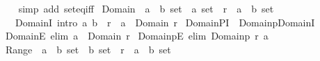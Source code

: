 \begin{isabellebody}
%
\isadelimproof
\ \ %
\endisadelimproof
%
\isatagproof
{}\isamarkupfalse%
\ {\isacharparenleft}{\kern0pt}simp\ add{\isacharcolon}{\kern0pt}\ set{\isacharunderscore}{\kern0pt}eq{\isacharunderscore}{\kern0pt}iff{\isacharparenright}{\kern0pt}%
\endisatagproof
{\isafoldproof}%
%
\isadelimproof
%
\endisadelimproof
%
\isadelimdocument
%
\endisadelimdocument
%
\isatagdocument
%
\isamarkuptrue%
%
\endisatagdocument
{\isafolddocument}%
%
\isadelimdocument
%
\endisadelimdocument
{}\isamarkupfalse%
\ Domain\ {\isacharcolon}{\kern0pt}{\isacharcolon}{\kern0pt}\ {\isachardoublequoteopen}{\isacharparenleft}{\kern0pt}{\isacharprime}{\kern0pt}a\ {\isasymtimes}\ {\isacharprime}{\kern0pt}b{\isacharparenright}{\kern0pt}\ set\ {\isasymRightarrow}\ {\isacharprime}{\kern0pt}a\ set{\isachardoublequoteclose}\ \ r\ {\isacharcolon}{\kern0pt}{\isacharcolon}{\kern0pt}\ {\isachardoublequoteopen}{\isacharparenleft}{\kern0pt}{\isacharprime}{\kern0pt}a\ {\isasymtimes}\ {\isacharprime}{\kern0pt}b{\isacharparenright}{\kern0pt}\ set{\isachardoublequoteclose}\isanewline
\ \ \ DomainI\ {\isacharbrackleft}{\kern0pt}intro{\isacharbrackright}{\kern0pt}{\isacharcolon}{\kern0pt}\ {\isachardoublequoteopen}{\isacharparenleft}{\kern0pt}a{\isacharcomma}{\kern0pt}\ b{\isacharparenright}{\kern0pt}\ {\isasymin}\ r\ {\isasymLongrightarrow}\ a\ {\isasymin}\ Domain\ r{\isachardoublequoteclose}\isanewline
\isanewline
{}\isamarkupfalse%
\ DomainPI\ {\isacharequal}{\kern0pt}\ Domainp{\isachardot}{\kern0pt}DomainI\isanewline
\isanewline
{}\isamarkupfalse%
\ DomainE\ {\isacharbrackleft}{\kern0pt}elim{\isacharbang}{\kern0pt}{\isacharbrackright}{\kern0pt}{\isacharcolon}{\kern0pt}\ {\isachardoublequoteopen}a\ {\isasymin}\ Domain\ r{\isachardoublequoteclose}\isanewline
{}\isamarkupfalse%
\ DomainpE\ {\isacharbrackleft}{\kern0pt}elim{\isacharbang}{\kern0pt}{\isacharbrackright}{\kern0pt}{\isacharcolon}{\kern0pt}\ {\isachardoublequoteopen}Domainp\ r\ a{\isachardoublequoteclose}\isanewline
\isanewline
{}\isamarkupfalse%
\ Range\ {\isacharcolon}{\kern0pt}{\isacharcolon}{\kern0pt}\ {\isachardoublequoteopen}{\isacharparenleft}{\kern0pt}{\isacharprime}{\kern0pt}a\ {\isasymtimes}\ {\isacharprime}{\kern0pt}b{\isacharparenright}{\kern0pt}\ set\ {\isasymRightarrow}\ {\isacharprime}{\kern0pt}b\ set{\isachardoublequoteclose}\ \ r\ {\isacharcolon}{\kern0pt}{\isacharcolon}{\kern0pt}\ {\isachardoublequoteopen}{\isacharparenleft}{\kern0pt}{\isacharprime}{\kern0pt}a\ {\isasymtimes}\ {\isacharprime}{\kern0pt}b{\isacharparenright}{\kern0pt}\ set{\isachardoublequoteclose}\isanewline

\end{isabellebody}
